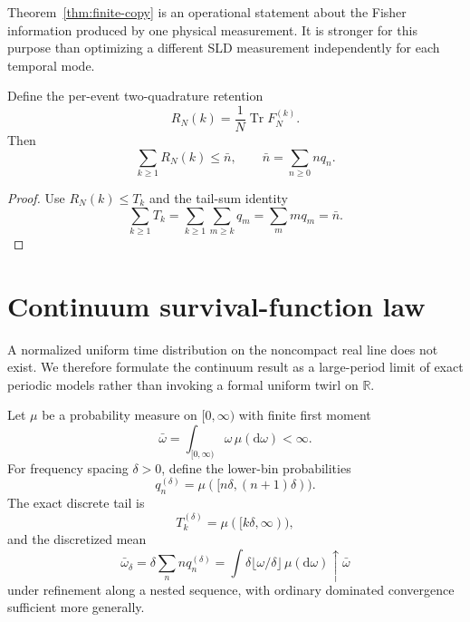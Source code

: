 \documentclass[aps,pra,reprint,amsmath,amssymb,longbibliography]{revtex4-2}
\newcommand{\Tr}{\operatorname{Tr}}
\newcommand{\dd}{\mathrm{d}}
\begin{document}
Theorem~\ref{thm:finite-copy} is an operational statement about the Fisher information produced by one physical measurement.  It is stronger for this purpose than optimizing a different SLD measurement independently for each temporal mode.

\begin{corollary}
\label{cor:sum}
Define the per-event two-quadrature retention
\begin{equation}
 R_N(k)=\frac1N\Tr F_N^{(k)}.
\end{equation}
Then
\begin{equation}
 \boxed{
 \sum_{k\geq1}R_N(k)\leq\bar n,
 \qquad
 \bar n=\sum_{n\geq0}nq_n .
 }
 \label{eq:sum-rule}
\end{equation}
\end{corollary}

\begin{proof}
Use $R_N(k)\leq T_k$ and the tail-sum identity
\begin{equation}
 \sum_{k\geq1}T_k
 =\sum_{k\geq1}\sum_{m\geq k}q_m
 =\sum_m mq_m=\bar n.
\end{equation}
\end{proof}

\section{Continuum survival-function law}
\label{sec:continuum}

A normalized uniform time distribution on the noncompact real line does not exist.  We therefore formulate the continuum result as a large-period limit of exact periodic models rather than invoking a formal uniform twirl on $\mathbb R$.

Let $\mu$ be a probability measure on $[0,\infty)$ with finite first moment
\begin{equation}
 \bar\omega=\int_{[0,\infty)}\omega\,\mu(\dd\omega)<\infty.
 \label{eq:omega-mean}
\end{equation}
For frequency spacing $\delta>0$, define the lower-bin probabilities
\begin{equation}
 q_n^{(\delta)}=\mu([n\delta,(n+1)\delta)).
 \label{eq:lower-bin}
\end{equation}
The exact discrete tail is
\begin{equation}
 T_k^{(\delta)}=\mu([k\delta,\infty)),
 \label{eq:exact-tail-bin}
\end{equation}
and the discretized mean
\begin{equation}
 \bar\omega_\delta
 =\delta\sum_n n q_n^{(\delta)}
 =\int \delta\lfloor\omega/\delta\rfloor\,\mu(\dd\omega)
 \uparrow\bar\omega
 \label{eq:mean-conv}
\end{equation}
under refinement along a nested sequence, with ordinary dominated convergence sufficient more generally.
\end{document}
